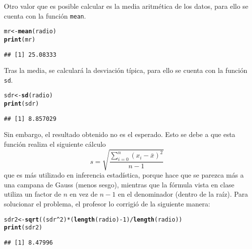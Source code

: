 \documentclass[12pt]{report}\usepackage[]{graphicx}\usepackage[dvipsnames]{xcolor}
\makeatletter
\newcommand{\hlnum}[1]{\textcolor[rgb]{0.686,0.059,0.569}{#1}}%
\newcommand{\hlopt}[1]{\textcolor[rgb]{0,0,0}{#1}}%
\newcommand{\hlstd}[1]{\textcolor[rgb]{0.345,0.345,0.345}{#1}}%
\newcommand{\hlkwb}[1]{\textcolor[rgb]{0.69,0.353,0.396}{#1}}%
\newcommand{\hlkwd}[1]{\textcolor[rgb]{0.737,0.353,0.396}{\textbf{#1}}}%
\newenvironment{kframe}{%
 \def\at@end@of@kframe{}%
 \ifinner\ifhmode%
  \def\at@end@of@kframe{\end{minipage}}%
  \begin{minipage}{\columnwidth}%
 \fi\fi%
 \def\FrameCommand##1{\hskip\@totalleftmargin \hskip-\fboxsep
 \colorbox{shadecolor}{##1}\hskip-\fboxsep
     \hskip-\linewidth \hskip-\@totalleftmargin \hskip\columnwidth}%
 \MakeFramed {\advance\hsize-\width
   \@totalleftmargin\z@ \linewidth\hsize
   \@setminipage}}%
 {\par\unskip\endMakeFramed%
 \at@end@of@kframe}
\newenvironment{knitrout}{}{} %
\makeatother
\begin{document}
			Otro valor que es posible calcular es la media aritmética de los datos, para ello se cuenta con la función \texttt{mean}.
			
\begin{knitrout}
\color{fgcolor}\begin{kframe}
\begin{alltt}
\hlstd{mr} \hlkwb{<-} \hlkwd{mean}\hlstd{(radio)}
\hlkwd{print}\hlstd{(mr)}
\end{alltt}
\begin{verbatim}
## [1] 25.08333
\end{verbatim}
\end{kframe}
\end{knitrout}
			
			Tras la media, se calculará la desviación típica, para ello se cuenta con la función \texttt{sd}. 
			
\begin{knitrout}
\color{fgcolor}\begin{kframe}
\begin{alltt}
\hlstd{sdr} \hlkwb{<-} \hlkwd{sd}\hlstd{(radio)}
\hlkwd{print}\hlstd{(sdr)}
\end{alltt}
\begin{verbatim}
## [1] 8.857029
\end{verbatim}
\end{kframe}
\end{knitrout}
			
			Sin embargo, el resultado obtenido no es el esperado. Esto se debe a que esta función realiza el siguiente cálculo
			$$
			s = \sqrt{\frac{\displaystyle\sum_{i=0}^n (x_i-\bar{x})^2}{n-1}}
			$$
			que es más utilizado en inferencia estadística, porque hace que se parezca más a una campana de Gauss (menos sesgo), mientras que la fórmula vista en clase utiliza un factor de $n$ en vez de $n-1$ en el denominador (dentro de la raíz). Para solucionar el problema, el profesor lo corrigió de la siguiente manera: 
			
\begin{knitrout}
\color{fgcolor}\begin{kframe}
\begin{alltt}
\hlstd{sdr2} \hlkwb{<-} \hlkwd{sqrt}\hlstd{((sdr}\hlopt{^}\hlnum{2}\hlstd{)}\hlopt{*}\hlstd{(}\hlkwd{length}\hlstd{(radio)}\hlopt{-}\hlnum{1}\hlstd{)}\hlopt{/}\hlkwd{length}\hlstd{(radio))}
\hlkwd{print}\hlstd{(sdr2)}
\end{alltt}
\begin{verbatim}
## [1] 8.47996
\end{verbatim}
\end{kframe}
\end{knitrout}
			
\end{document}
